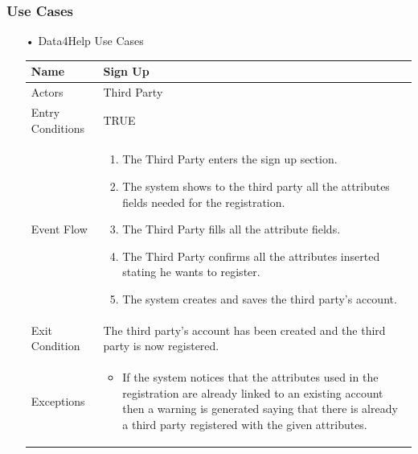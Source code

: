 \subsubsection{Use Cases}
\begin{enumerate}
\FloatBarrier
\item[•]{\Large Data4Help Use Cases}
\FloatBarrier
\begin{table}[h]
\begin{tabular}{|l|p{}|}
\hline
Name             & Sign Up \\ \hline
Actors           & Third Party \\ \hline
Entry Conditions & TRUE    \\ \hline
Event Flow       & \begin{enumerate}
            \item The Third Party enters the sign up section.
            \item The system shows to the third party all the attributes fields needed for the registration.
            \item The Third Party fills all the attribute fields.
            \item The Third Party confirms all the attributes inserted stating he wants to register.
            \item The system creates and saves the third party's account.
        \end{enumerate}\\ \hline
Exit Condition   & The third party's account has been created and the third party is now registered.\\ \hline
Exceptions       & \begin{itemize}
\item If the system notices that the attributes used in the registration are already linked to an existing account then a warning is generated saying that there is already a third party registered with the given attributes.
\end{itemize}\\ \hline
\end{tabular}
\end{table}
\FloatBarrier


\end{enumerate}
